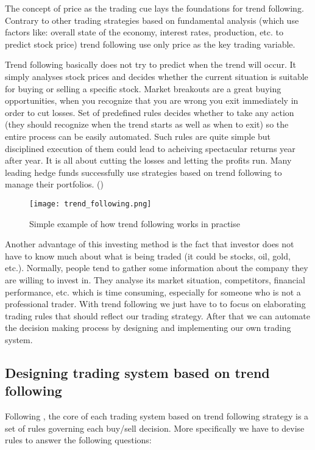 The concept of price as the trading cue lays the foundations for trend following. 
Contrary to other trading strategies based on fundamental analysis (which use factors like: overall state of the economy, interest rates, production, etc. to predict stock price)
trend following use only price as the key trading variable. 

Trend following basically does not try to predict when the trend will occur. 
It simply analyses stock prices and decides whether the current situation is suitable for buying or selling a specific stock.
Market breakouts are a great buying opportunities, when you recognize that you are wrong you exit immediately in order to cut losses.
Set of predefined rules decides  whether to take any action (they should recognize when the trend starts as well as when to exit) so the entire process can be easily automated.
Such rules are quite simple but disciplined execution of them could lead to acheiving spectacular returns year after year.
It is all about cutting the losses and letting the profits run.
Many leading hedge funds successfully use strategies based on trend following to manage their portfolios. (\cite{Trend01})  

\newpage
\begin{figure}[ht]
  \begin{center}
    \texttt{[image: trend\_following.png]}
  \end{center}
  \caption{Simple example of how trend following works in practise}
\end{figure}

Another advantage of this investing method is the fact that investor does not have to know much about what is being traded (it could be stocks, oil, gold, etc.).
Normally, people tend to gather some information about the company they are willing to invest in. 
They analyse its market situation, competitors, financial performance, etc. which is time consuming, especially for someone who is not a professional trader.
With trend following we just have to to focus on elaborating trading rules that should reflect our trading strategy.
After that we can automate the decision making process by designing and implementing our own trading system.   


\subsection{Designing trading system based on trend following} 

Following \cite{Trend01}, the core of each trading system based on trend following strategy is a set of rules governing each buy/sell decision.
More specifically we have to devise rules to answer the following questions:

